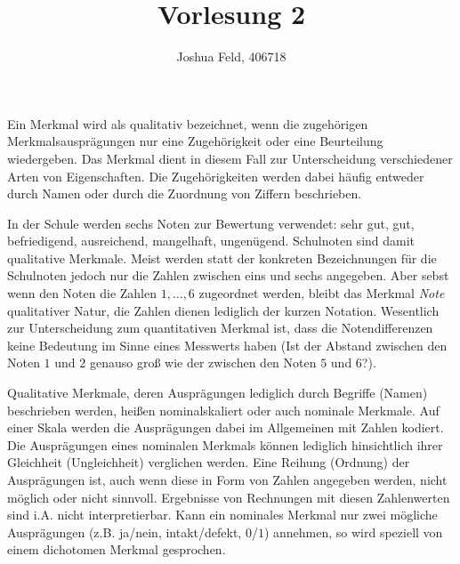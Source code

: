 \documentclass{lecture}
\institute{Institut für Statistik und Wirtschaftsmathematik}
\title{Vorlesung 2}
\author{Joshua Feld, 406718}
\begin{document}
    \maketitle


    Ein Merkmal wird als qualitativ bezeichnet, wenn die zugehörigen Merkmalsausprägungen nur eine Zugehörigkeit oder eine Beurteilung wiedergeben.
    Das Merkmal dient in diesem Fall zur Unterscheidung verschiedener Arten von Eigenschaften.
    Die Zugehörigkeiten werden dabei häufig entweder durch Namen oder durch die Zuordnung von Ziffern beschrieben.

    \begin{example}
        In der Schule werden sechs Noten zur Bewertung verwendet: sehr gut, gut, befriedigend, ausreichend, mangelhaft, ungenügend.
        Schulnoten sind damit qualitative Merkmale.
        Meist werden statt der konkreten Bezeichnungen für die Schulnoten jedoch nur die Zahlen zwischen eins und sechs angegeben.
        Aber sebst wenn den Noten die Zahlen \(1, \ldots, 6\) zugeordnet werden, bleibt das Merkmal \emph{Note} qualitativer Natur, die Zahlen dienen lediglich der kurzen Notation.
        Wesentlich zur Unterscheidung zum quantitativen Merkmal ist, dass die Notendifferenzen keine Bedeutung im Sinne eines Messwerts haben (Ist der Abstand zwischen den Noten \(1\) und \(2\) genauso groß wie der zwischen den Noten \(5\) und \(6\)?).
    \end{example}

    Qualitative Merkmale, deren Ausprägungen lediglich durch Begriffe (Namen) beschrieben werden, heißen nominalskaliert oder auch nominale Merkmale.
    Auf einer Skala werden die Ausprägungen dabei im Allgemeinen mit Zahlen kodiert.
    Die Ausprägungen eines nominalen Merkmals können lediglich hinsichtlich ihrer Gleichheit (Ungleichheit) verglichen werden.
    Eine Reihung (Ordnung) der Ausprägungen ist, auch wenn diese in Form von Zahlen angegeben werden, nicht möglich oder nicht sinnvoll.
    Ergebnisse von Rechnungen mit diesen Zahlenwerten sind i.A. nicht interpretierbar.
    Kann ein nominales Merkmal nur zwei mögliche Ausprägungen (z.B. ja/nein, intakt/defekt, \(0\)/\(1\)) annehmen, so wird speziell von einem dichotomen Merkmal gesprochen.
\end{document}
